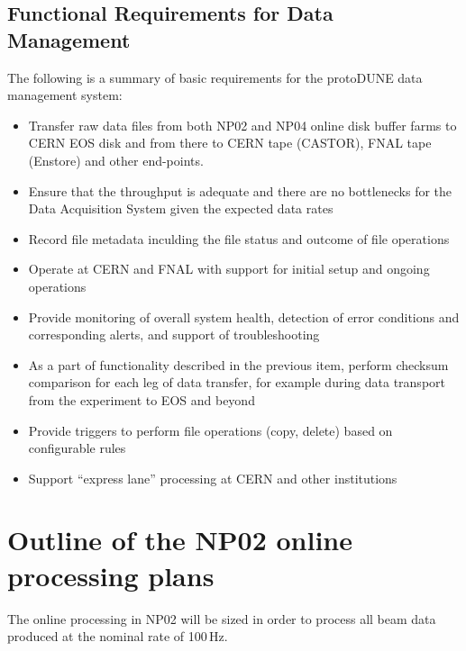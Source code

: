 \documentclass[12pt]{article}
\newcommand{\pd}{protoDUNE\xspace}
\begin{document}
\subsection{Functional Requirements for Data Management}
\label{sec:func_reqs}
The following is a summary of basic requirements for the \pd data management system:
\begin{itemize}

\item Transfer raw data files from both NP02 and NP04 online disk buffer farms
to CERN EOS disk and from there to CERN tape (CASTOR), FNAL tape (Enstore) and other end-points.

\item Ensure that the throughput is adequate and there are no bottlenecks for the Data Acquisition System
given the expected data rates

\item Record file metadata inculding the file status and outcome of file operations

\item Operate at CERN and FNAL with support for initial setup and ongoing operations

\item Provide monitoring of overall system health, detection of error conditions and corresponding alerts, and support of troubleshooting

\item As a part of functionality described in the previous item, perform checksum comparison for each leg of data transfer, for
example during data transport from the experiment to EOS and beyond

\item Provide triggers to perform file operations (copy, delete) based on configurable rules

\item Support ``express lane'' processing at CERN and other institutions

\end{itemize}



\section{Outline of the NP02 online processing plans}
\label{sec:np02_online_processing}
The online processing in NP02 will be sized in order to process all beam data produced at the nominal rate of 100\,Hz. 
\end{document}

